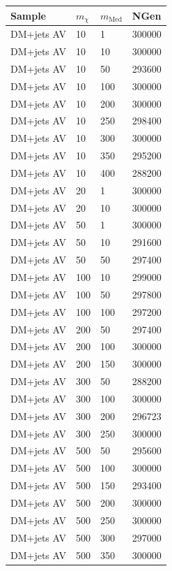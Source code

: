 \begin{table}[]
\centering
\begin{tabular}{llll}
\hline \hline
Sample & $m_\chi$    & $m_\textrm{Med}$    & NGen \\ \hline
DM+jets  AV & 10   & 1    &300000 \\
DM+jets  AV & 10   & 10   &300000 \\
DM+jets  AV & 10   & 50   &293600 \\
DM+jets  AV & 10   & 100  &300000 \\
DM+jets  AV & 10   & 200  &300000 \\
DM+jets  AV & 10   & 250  &298400 \\
DM+jets  AV & 10   & 300  &300000 \\
DM+jets  AV & 10   & 350  &295200 \\
DM+jets  AV & 10   & 400  &288200 \\
DM+jets  AV & 20   & 1    &300000 \\
DM+jets  AV & 20   & 10   &300000 \\
DM+jets  AV & 50   & 1    &300000 \\
DM+jets  AV & 50   & 10   &291600 \\
DM+jets  AV & 50   & 50   &297400 \\
DM+jets  AV & 100  & 10   &299000 \\
DM+jets  AV & 100  & 50   &297800 \\
DM+jets  AV & 100  & 100  &297200 \\
DM+jets  AV & 200  & 50   &297400 \\
DM+jets  AV & 200  & 100  &300000 \\
DM+jets  AV & 200  & 150  &300000 \\
DM+jets  AV & 300  & 50   &288200 \\
DM+jets  AV & 300  & 100  &300000 \\
DM+jets  AV & 300  & 200  &296723 \\
DM+jets  AV & 300  & 250  &300000 \\
DM+jets  AV & 500  & 50   &295600 \\
DM+jets  AV & 500  & 100  &300000 \\
DM+jets  AV & 500  & 150  &293400 \\
DM+jets  AV & 500  & 200  &300000 \\
DM+jets  AV & 500  & 250  &300000 \\
DM+jets  AV & 500  & 300  &297000 \\
DM+jets  AV & 500  & 350  &300000 \\

\end{tabular}
\end{table}
